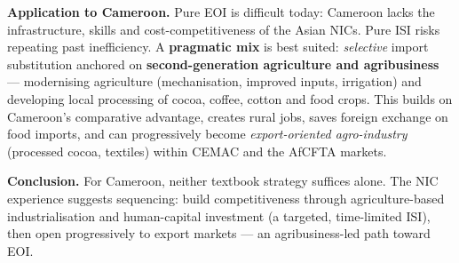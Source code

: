 \documentclass[11pt]{article}
\begin{document}
\begin{corrige}
\textbf{Application to Cameroon.} Pure EOI is difficult today: Cameroon lacks the infrastructure, skills and cost-competitiveness of the Asian NICs. Pure ISI risks repeating past inefficiency. A \textbf{pragmatic mix} is best suited: \emph{selective} import substitution anchored on \textbf{second-generation agriculture and agribusiness} — modernising agriculture (mechanisation, improved inputs, irrigation) and developing local processing of cocoa, coffee, cotton and food crops. This builds on Cameroon's comparative advantage, creates rural jobs, saves foreign exchange on food imports, and can progressively become \emph{export-oriented agro-industry} (processed cocoa, textiles) within CEMAC and the AfCFTA markets.

\textbf{Conclusion.} For Cameroon, neither textbook strategy suffices alone. The NIC experience suggests sequencing: build competitiveness through agriculture-based industrialisation and human-capital investment (a targeted, time-limited ISI), then open progressively to export markets — an agribusiness-led path toward EOI.
\end{corrige}
\end{document}
